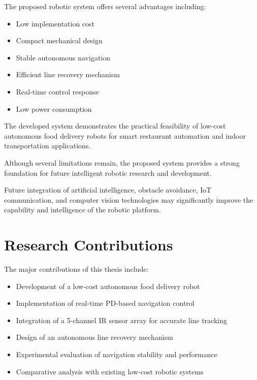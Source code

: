 \documentclass[12pt,a4paper,oneside]{report}
\begin{document}
The proposed robotic system offers several advantages including:

\begin{itemize}

\item Low implementation cost

\item Compact mechanical design

\item Stable autonomous navigation

\item Efficient line recovery mechanism

\item Real-time control response

\item Low power consumption

\end{itemize}

The developed system demonstrates the practical feasibility of low-cost autonomous food delivery robots for smart restaurant automation and indoor transportation applications.

Although several limitations remain, the proposed system provides a strong foundation for future intelligent robotic research and development.

Future integration of artificial intelligence, obstacle avoidance, IoT communication, and computer vision technologies may significantly improve the capability and intelligence of the robotic platform.


\section{Research Contributions}

The major contributions of this thesis include:

\begin{itemize}

\item Development of a low-cost autonomous food delivery robot

\item Implementation of real-time PD-based navigation control

\item Integration of a 5-channel IR sensor array for accurate line tracking

\item Design of an autonomous line recovery mechanism

\item Experimental evaluation of navigation stability and performance

\item Comparative analysis with existing low-cost robotic systems

\end{itemize}
\end{document}
